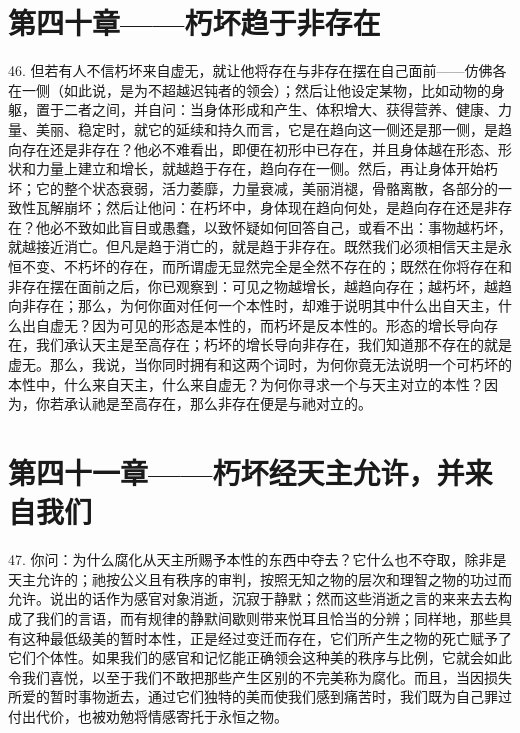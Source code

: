 
\section{第四十章——朽坏趋于非存在}

46. 但若有人不信朽坏来自虚无，就让他将存在与非存在摆在自己面前——仿佛各在一侧（如此说，是为不超越迟钝者的领会）；然后让他设定某物，比如动物的身躯，置于二者之间，并自问：当身体形成和产生、体积增大、获得营养、健康、力量、美丽、稳定时，就它的延续和持久而言，它是在趋向这一侧还是那一侧，是趋向存在还是非存在？他必不难看出，即便在初形中已存在，并且身体越在形态、形状和力量上建立和增长，就越趋于存在，趋向存在一侧。然后，再让身体开始朽坏；它的整个状态衰弱，活力萎靡，力量衰减，美丽消褪，骨骼离散，各部分的一致性瓦解崩坏；然后让他问：在朽坏中，身体现在趋向何处，是趋向存在还是非存在？他必不致如此盲目或愚蠢，以致怀疑如何回答自己，或看不出：事物越朽坏，就越接近消亡。但凡是趋于消亡的，就是趋于非存在。既然我们必须相信天主是永恒不变、不朽坏的存在，而所谓虚无显然完全是全然不存在的；既然在你将存在和非存在摆在面前之后，你已观察到：可见之物越增长，越趋向存在；越朽坏，越趋向非存在；那么，为何你面对任何一个本性时，却难于说明其中什么出自天主，什么出自虚无？因为可见的形态是本性的，而朽坏是反本性的。形态的增长导向存在，我们承认天主是至高存在；朽坏的增长导向非存在，我们知道那不存在的就是虚无。那么，我说，当你同时拥有和这两个词时，为何你竟无法说明一个可朽坏的本性中，什么来自天主，什么来自虚无？为何你寻求一个与天主对立的本性？因为，你若承认祂是至高存在，那么非存在便是与祂对立的。\par


\section{第四十一章——朽坏经天主允许，并来自我们}

47. 你问：为什么腐化从天主所赐予本性的东西中夺去？它什么也不夺取，除非是天主允许的；祂按公义且有秩序的审判，按照无知之物的层次和理智之物的功过而允许。说出的话作为感官对象消逝，沉寂于静默；然而这些消逝之言的来来去去构成了我们的言语，而有规律的静默间歇则带来悦耳且恰当的分辨；同样地，那些具有这种最低级美的暂时本性，正是经过变迁而存在，它们所产生之物的死亡赋予了它们个体性。如果我们的感官和记忆能正确领会这种美的秩序与比例，它就会如此令我们喜悦，以至于我们不敢把那些产生区别的不完美称为腐化。而且，当因损失所爱的暂时事物逝去，通过它们独特的美而使我们感到痛苦时，我们既为自己罪过付出代价，也被劝勉将情感寄托于永恒之物。\par

